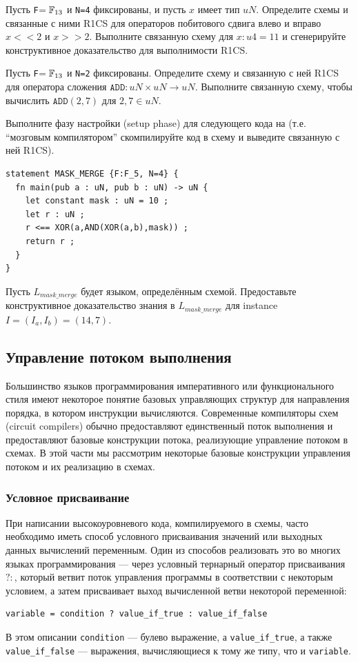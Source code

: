 \begin{exercise}
Пусть \texttt{F}$=\mathbb{F}_{13}$ и \texttt{N=4} фиксированы, и пусть $x$ имеет тип $uN$. Определите схемы и связанные с ними R1CS для операторов побитового сдвига влево и вправо $x<<2$ и $x>>2$. Выполните связанную схему для $x : u4 = 11$ и сгенерируйте конструктивное доказательство для выполнимости R1CS.
\end{exercise}
\begin{exercise}
Пусть \texttt{F}$=\mathbb{F}_{13}$ и \texttt{N=2} фиксированы. Определите схему и связанную с ней R1CS для оператора сложения $\mathtt{ADD}: uN \times uN \to uN$. Выполните связанную схему, чтобы вычислить $\mathtt{ADD}(2,7)$ для $2,7\in uN$.
\end{exercise}
\begin{exercise} Выполните фазу настройки (setup phase) для следующего кода на  (т.е. ``мозговым компилятором'' скомпилируйте код в схему и выведите связанную с ней R1CS).
\begin{lstlisting}
statement MASK_MERGE {F:F_5, N=4} {
  fn main(pub a : uN, pub b : uN) -> uN {
    let constant mask : uN = 10 ;
    let r : uN ;
    r <== XOR(a,AND(XOR(a,b),mask)) ;
    return r ;
  }
}
\end{lstlisting}
Пусть $L_{mask\_merge}$ будет языком, определённым схемой. Предоставьте конструктивное доказательство знания в $L_{mask\_merge}$ для instance $I=(I_a, I_b) = (14, 7)$.
\end{exercise}
\subsection{Управление потоком выполнения} Большинство языков программирования императивного или функционального стиля имеют некоторое понятие базовых управляющих структур для направления порядка, в котором инструкции вычисляются. Современные компиляторы схем (circuit compilers) обычно предоставляют единственный поток выполнения и предоставляют базовые конструкции потока, реализующие управление потоком в схемах. В этой части мы рассмотрим некоторые базовые конструкции управления потоком и их реализацию в схемах.
\subsubsection{Условное присваивание} При написании высокоуровневого кода, компилируемого в схемы, часто необходимо иметь способ условного присваивания значений или выходных данных вычислений переменным. Один из способов реализовать это во многих языках программирования --- через условный тернарный оператор присваивания $?:$, который ветвит поток управления программы в соответствии с некоторым условием, а затем присваивает выход вычисленной ветви некоторой переменной:
\begin{lstlisting}
variable = condition ? value_if_true : value_if_false  
\end{lstlisting}
В этом описании \texttt{condition} --- булево выражение, а \texttt{value\_if\_true}, а также \texttt{value\_if\_false} --- выражения, вычисляющиеся к тому же типу, что и \texttt{variable}.

